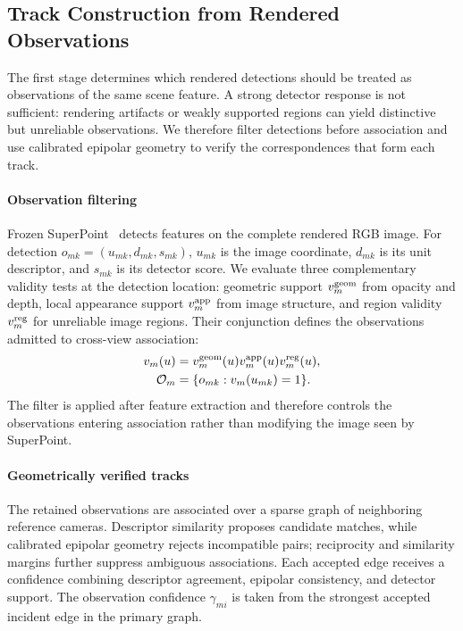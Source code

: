 \subsection{Track Construction from Rendered Observations}
\label{sec:observations}
\label{sec:construction}


The first stage determines which rendered detections should be treated as observations of the same scene feature. A strong detector response is not sufficient: rendering artifacts or weakly supported regions can yield distinctive but unreliable observations. We therefore filter detections before association and use calibrated epipolar geometry to verify the correspondences that form each track.

\paragraph{Observation filtering}
Frozen SuperPoint~\cite{detone2018superpoint} detects features on the complete rendered RGB image. For detection $o_{mk}=(u_{mk},d_{mk},s_{mk})$, $u_{mk}$ is the image coordinate, $d_{mk}$ is its unit descriptor, and $s_{mk}$ is its detector score. We evaluate three complementary validity tests at the detection location: geometric support $v_m^{\rm geom}$ from opacity and depth, local appearance support $v_m^{\rm app}$ from image structure, and region validity $v_m^{\rm reg}$ for unreliable image regions. Their conjunction defines the observations admitted to cross-view association:
\begin{equation}
\begin{aligned}
v_m(u)&=v_m^{\rm geom}(u)v_m^{\rm app}(u)v_m^{\rm reg}(u),\\
\mathcal O_m&=\{o_{mk}:v_m(u_{mk})=1\}.
\end{aligned}
\label{eq:observation_filter}
\end{equation}
The filter is applied after feature extraction and therefore controls the observations entering association rather than modifying the image seen by SuperPoint.

\paragraph{Geometrically verified tracks}
The retained observations are associated over a sparse graph of neighboring reference cameras. Descriptor similarity proposes candidate matches, while calibrated epipolar geometry rejects incompatible pairs; reciprocity and similarity margins further suppress ambiguous associations. Each accepted edge receives a confidence combining descriptor agreement, epipolar consistency, and detector support. The observation confidence $\gamma_{mi}$ is taken from the strongest accepted incident edge in the primary graph.

